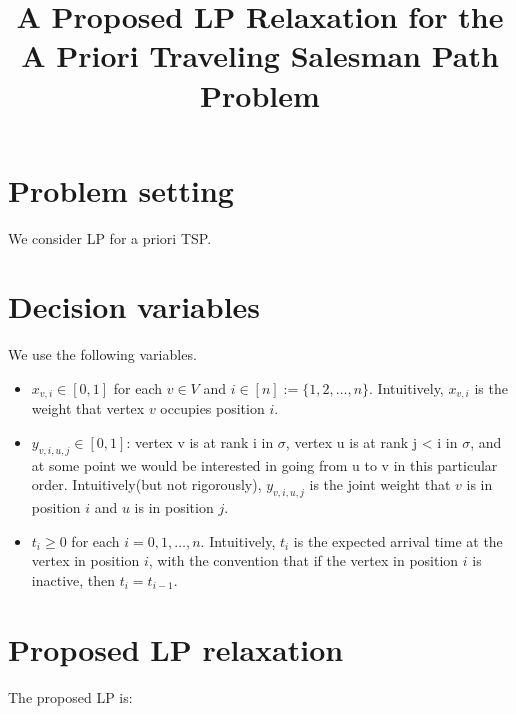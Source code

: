 \documentclass[11pt]{article}
\title{A Proposed LP Relaxation for the A Priori Traveling Salesman Path Problem}
\author{}
\date{}
\begin{document}
\maketitle

\section*{Problem setting}
We consider LP for a priori TSP.

\section*{Decision variables}
We use the following variables.

\begin{itemize}[leftmargin=1.5em]
    \item $x_{v,i} \in [0,1]$ for each $v \in V$ and $i \in [n] := \{1,2,\dots,n\}$. Intuitively, $x_{v,i}$ is the weight that vertex $v$ occupies position $i$.
    \item $y_{v,i,u,j} \in [0,1]$: vertex v is at rank i in $\sigma$, vertex u is at rank j < i in $\sigma$, and at some point we would be interested in going from u to v in this particular order. Intuitively(but not rigorously), $y_{v,i,u,j}$ is the joint weight that $v$ is in position $i$ and $u$ is in position $j$.
    \item $t_i \ge 0$ for each $i=0,1,\dots,n$. Intuitively, $t_i$ is the expected arrival time at the vertex in position $i$, with the convention that if the vertex in position $i$ is inactive, then $t_i=t_{i-1}$.
\end{itemize}

\section*{Proposed LP relaxation}
The proposed LP is:
\end{document}
